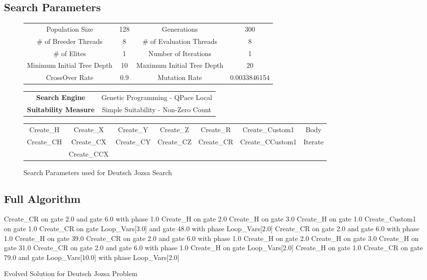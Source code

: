 \clearpage
\subsection{Search Parameters}
\label{sec:deutschjozsasearchparams}

\begin{figure}[h!]
\begin{center}
 \begin{tabular}{|cc|cc|}
\hline
  Population Size & 128 & Generations & 300 \\
  \# of Breeder Threads & 8 & \# of Evaluation Threads & 8 \\
  \# of Elites & 1 & Number of Iterations & 1 \\
  Minimum Initial Tree Depth & 10 & Maximum Initial Tree Depth & 20 \\
  CrossOver Rate & 0.9 & Mutation Rate & 0.0033846154 \\
\hline
 \end{tabular}
 \begin{tabular}{cc}
  \textbf{Search Engine} & Genetic Programming - QPace Local \\
  \textbf{Suitability Measure} & Simple Suitability - Non-Zero Count \\
 \end{tabular}
\begin{tabular}{|ccccccc|}
\hline
  Create\_H & Create\_X& Create\_Y& Create\_Z & Create\_R & Create\_Custom1 & Body \\
  Create\_CH & Create\_CX & Create\_CY & Create\_CZ & Create\_CR & Create\_CCustom1 & Iterate \\
   & Create\_CCX &  & &  &  &  \\
\hline
 \end{tabular}
\end{center}
\caption{Search Parameters used for Deutsch Jozsa Search}
\label{fig:deutschjozsaparams}
\end{figure}

\subsection{Full Algorithm}
\label{sec:DeutschJozsaExpAppFullAlg}

\begin{algorithm}
 \begin{algorithmic}
\STATE Create\_CR on gate 2.0 and gate 6.0 with phase 1.0
\STATE Create\_H on gate 2.0
\STATE Create\_H on gate 3.0
\STATE Create\_H on gate 1.0
\STATE Create\_Custom1 on gate 1.0
\STATE Create\_CR on gate Loop\_Vars[3.0] and gate 48.0 with phase Loop\_Vars[2.0]
\STATE Create\_CR on gate 2.0 and gate 6.0 with phase 1.0
\STATE Create\_H on gate 39.0
\STATE Create\_CR on gate 2.0 and gate 6.0 with phase 1.0
\STATE Create\_H on gate 2.0
\STATE Create\_H on gate 3.0
\STATE Create\_H on gate 31.0
\STATE Create\_CR on gate 2.0 and gate 6.0 with phase 1.0
\STATE Create\_H on gate Loop\_Vars[2.0]
\STATE Create\_H on gate 1.0
\STATE Create\_CR on gate 79.0 and gate Loop\_Vars[10.0] with phase Loop\_Vars[2.0]
 \end{algorithmic}
\caption{Evolved Solution for Deutsch Jozsa Problem}
\label{alg:evodeutschjozsa}
\end{algorithm}

